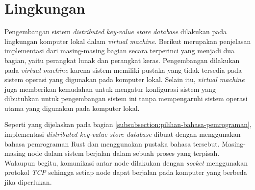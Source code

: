 \section{Lingkungan}
\label{sec:environment}

Pengembangan sistem \textit{distributed key-value store database} dilakukan pada lingkungan komputer lokal dalam \textit{virtual machine}. Berikut merupakan penjelasan implementasi dari masing-masing bagian secara terperinci yang menjadi dua bagian, yaitu perangkat lunak dan perangkat keras. Pengembangan dilakukan pada \textit{virtual machine} karena sistem memiliki pustaka yang tidak tersedia pada sistem operasi yang digunakan pada komputer lokal. Selain itu, \textit{virtual machine} juga memberikan kemudahan untuk mengatur konfigurasi sistem yang dibutuhkan untuk pengembangan sistem ini tanpa mempengaruhi sistem operasi utama yang digunakan pada komputer lokal.

Seperti yang dijelaskan pada bagian \ref{subsubsection:pilihan-bahasa-pemrograman}, implementasi \textit{distributed key-value store database} dibuat dengan menggunakan bahasa pemrograman Rust dan menggunakan pustaka bahasa tersebut. Masing-masing node dalam sistem berjalan dalam sebuah proses yang terpisah. Walaupun begitu, komunikasi antar node dilakukan dengan \textit{socket} menggunakan protokol \textit{TCP} sehingga setiap node dapat berjalan pada komputer yang berbeda jika diperlukan.

